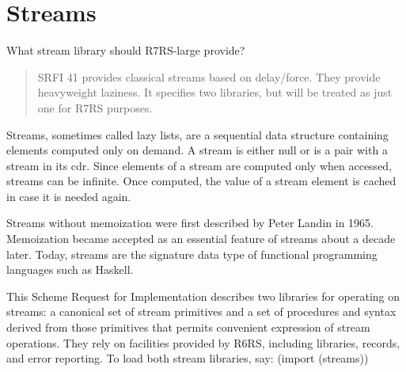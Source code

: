 \section{Streams}
 What stream library should R7RS-large provide?

\begin{quote}
SRFI 41 provides classical streams based on delay/force. They provide
heavyweight laziness. It specifies two libraries, but will be treated as
just one for R7RS purposes.
\end{quote}





Streams, sometimes called lazy lists, are a sequential data structure
containing elements computed only on demand. A stream is either null or
is a pair with a stream in its cdr. Since elements of a stream are
computed only when accessed, streams can be infinite. Once computed, the
value of a stream element is cached in case it is needed again.

Streams without memoization were first described by Peter Landin in
1965. Memoization became accepted as an essential feature of streams
about a decade later. Today, streams are the signature data type of
functional programming languages such as Haskell.

 This Scheme Request for Implementation describes two libraries for
operating on streams: a canonical set of stream primitives and a set of
procedures and syntax derived from those primitives that permits
convenient expression of stream operations. They rely on facilities
provided by R6RS, including libraries, records, and error reporting. To
load both stream libraries, say: (import (streams))

